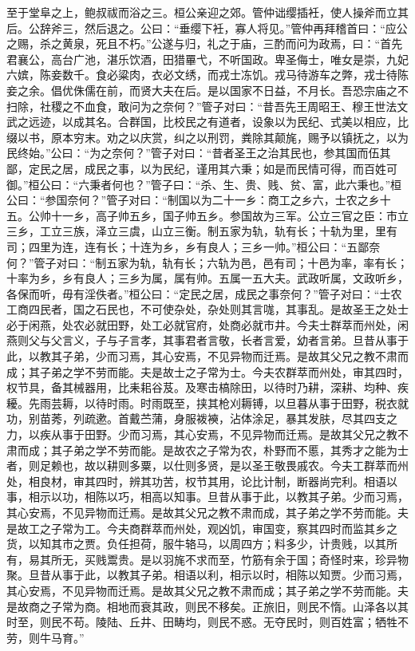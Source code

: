 \documentclass[]{article}
\begin{document}
至于堂阜之上，鲍叔祓而浴之三。桓公亲迎之郊。管仲诎缨插衽，使人操斧而立其后。公辞斧三，然后退之。公曰：``垂缨下衽，寡人将见。''管仲再拜稽首曰：``应公之赐，杀之黄泉，死且不朽。''公遂与归，礼之于庙，三酌而问为政焉，曰：``首先君襄公，高台广池，湛乐饮酒，田猎罼弋，不听国政。卑圣侮士，唯女是崇，九妃六嫔，陈妾数千。食必粱肉，衣必文绣，而戎士冻饥。戎马待游车之弊，戎士待陈妾之余。倡优侏儒在前，而贤大夫在后。是以国家不日益，不月长。吾恐宗庙之不扫除，社稷之不血食，敢问为之奈何？''管子对曰：``昔吾先王周昭王、穆王世法文武之远迹，以成其名。合群国，比校民之有道者，设象以为民纪、式美以相应，比缀以书，原本穷末。劝之以庆赏，纠之以刑罚，粪除其颠旄，赐予以镇抚之，以为民终始。''公曰：``为之奈何？''管子对曰：``昔者圣王之治其民也，参其国而伍其鄙，定民之居，成民之事，以为民纪，谨用其六秉；如是而民情可得，而百姓可御。''桓公曰：``六秉者何也？''管子曰：``杀、生、贵、贱、贫、富，此六秉也。''桓公曰：``参国奈何？''管子对曰：``制国以为二十一乡：商工之乡六，士农之乡十五。公帅十一乡，高子帅五乡，国子帅五乡。参国故为三军。公立三官之臣：市立三乡，工立三族，泽立三虞，山立三衡。制五家为轨，轨有长；十轨为里，里有司；四里为连，连有长；十连为乡，乡有良人；三乡一帅。''桓公曰：``五鄙奈何？''管子对曰：``制五家为轨，轨有长；六轨为邑，邑有司；十邑为率，率有长；十率为乡，乡有良人；三乡为属，属有帅。五属一五大夫。武政听属，文政听乡，各保而听，毋有淫佚者。''桓公曰：``定民之居，成民之事奈何？''管子对曰：``士农工商四民者，国之石民也，不可使杂处，杂处则其言哤，其事乱。是故圣王之处士必于闲燕，处农必就田野，处工必就官府，处商必就市井。今夫士群萃而州处，闲燕则父与父言义，子与子言孝，其事君者言敬，长者言爱，幼者言弟。旦昔从事于此，以教其子弟，少而习焉，其心安焉，不见异物而迁焉。是故其父兄之教不肃而成；其子弟之学不劳而能。夫是故士之子常为士。今夫农群萃而州处，审其四时，权节具，备其械器用，比耒耜谷芨。及寒击槁除田，以待时乃耕，深耕、均种、疾耰。先雨芸耨，以待时雨。时雨既至，挟其枪刈耨镈，以旦暮从事于田野，税衣就功，别苗莠，列疏遬。首戴苎蒲，身服袯襫，沾体涂足，暴其发肤，尽其四支之力，以疾从事于田野。少而习焉，其心安焉，不见异物而迁焉。是故其父兄之教不肃而成；其子弟之学不劳而能。是故农之子常为农，朴野而不慝，其秀才之能为士者，则足赖也，故以耕则多粟，以仕则多贤，是以圣王敬畏戚农。今夫工群萃而州处，相良材，审其四时，辨其功苦，权节其用，论比计制，断器尚完利。相语以事，相示以功，相陈以巧，相高以知事。旦昔从事于此，以教其子弟。少而习焉，其心安焉，不见异物而迁焉。是故其父兄之教不肃而成，其子弟之学不劳而能。夫是故工之子常为工。今夫商群萃而州处，观凶饥，审国变，察其四时而监其乡之货，以知其市之贾。负任担荷，服牛辂马，以周四方；料多少，计贵贱，以其所有，易其所无，买贱鬻贵。是以羽旄不求而至，竹筋有余于国；奇怪时来，珍异物聚。旦昔从事于此，以教其子弟。相语以利，相示以时，相陈以知贾。少而习焉，其心安焉，不见异物而迁焉。是故其父兄之教不肃而成；其子弟之学不劳而能。夫是故商之子常为商。相地而衰其政，则民不移矣。正旅旧，则民不惰。山泽各以其时至，则民不苟。陵陆、丘井、田畴均，则民不惑。无夺民时，则百姓富；牺牲不劳，则牛马育。''
\end{document}

